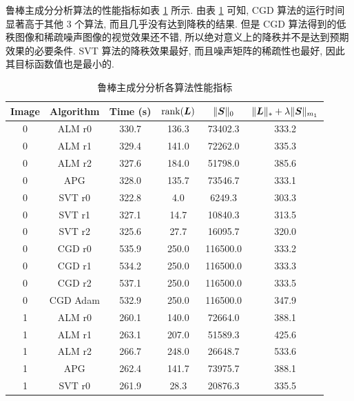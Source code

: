 \documentclass[12pt]{article}
\begin{document}
鲁棒主成分分析算法的性能指标如表 \ref{tab:rpca_index} 所示. 由表 \ref{tab:rpca_index} 可知, CGD 算法的运行时间显著高于其他 3 个算法, 而且几乎没有达到降秩的结果. 但是 CGD 算法得到的低秩图像和稀疏噪声图像的视觉效果还不错, 所以绝对意义上的降秩并不是达到预期效果的必要条件. SVT 算法的降秩效果最好, 而且噪声矩阵的稀疏性也最好, 因此其目标函数值也是最小的.

\begin{table}[!htbp]
  \centering
  \small
  \caption{鲁棒主成分分析各算法性能指标}
  \label{tab:rpca_index}
  \begin{tabular}{cccccc}
    \toprule
    Image & Algorithm      & Time (s)  & $\operatorname{rank}(\bm{L})$ & $\|\bm{S}\|_0$    & $\|\bm{L}\|_{*}+\lambda\|\bm{S}\|_{m_1}$ \\
    \midrule
    0     & ALM r0    & 330.7    & 136.3       & 73402.3     & 333.2         \\
    0     & ALM r1    & 329.4    & 141.0       & 72262.0     & 335.3         \\
    0     & ALM r2    & 327.6    & 184.0       & 51798.0     & 385.6         \\
    0     & APG       & 328.0    & 135.7       & 73546.7     & 333.1         \\
    0     & SVT r0    & 322.8    & 4.0         & 6249.3      & 303.3         \\
    0     & SVT r1    & 327.1    & 14.7        & 10840.3     & 313.5         \\
    0     & SVT r2    & 325.6    & 27.7        & 16095.7     & 320.0         \\
    0     & CGD r0    & 535.9    & 250.0       & 116500.0    & 333.2         \\
    0     & CGD r1    & 534.2    & 250.0       & 116500.0    & 333.3         \\
    0     & CGD r2    & 537.1    & 250.0       & 116500.0    & 333.5         \\
    0     & CGD Adam  & 532.9    & 250.0       & 116500.0    & 347.9         \\
    1     & ALM r0    & 260.1    & 140.0       & 72664.0     & 388.1         \\
    1     & ALM r1    & 263.1    & 207.0       & 51589.3     & 425.6         \\
    1     & ALM r2    & 266.7    & 248.0       & 26648.7     & 533.6         \\
    1     & APG       & 262.4    & 141.7       & 73975.7     & 388.1         \\
    1     & SVT r0    & 261.9    & 28.3        & 20876.3     & 335.5         \\

\end{tabular}
\end{table}
\end{document}
